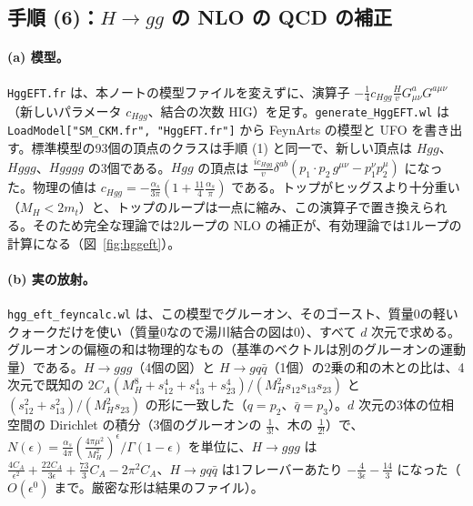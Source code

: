 \documentclass[a4paper,10pt]{ltjsarticle}
\begin{document}
\subsection{手順 (6)：$H\to gg$ の NLO の QCD の補正}\label{sec:step6}

\paragraph{(a) 模型。}\texttt{HggEFT.fr} は、本ノートの模型ファイルを変えずに、演算子 $-\frac14c_{Hgg}\frac H{v}G^a_{\mu\nu}G^{a\mu\nu}$（新しいパラメータ $c_{Hgg}$、結合の次数 HIG）を足す。\texttt{generate\_HggEFT.wl} は \texttt{LoadModel["SM\_CKM.fr", "HggEFT.fr"]} から FeynArts の模型と UFO を書き出す。標準模型の93個の頂点のクラスは手順 (1) と同一で、新しい頂点は $Hgg$、$Hggg$、$Hgggg$ の3個である。$Hgg$ の頂点は $\frac{ic_{Hgg}}v\delta^{ab}(p_1\cdot p_2\,g^{\mu\nu}-p_1^\nu p_2^\mu)$ になった。物理の値は $c_{Hgg}=-\frac{\alpha_s}{3\pi}(1+\frac{11}4\frac{\alpha_s}\pi)$ である。トップがヒッグスより十分重い（$M_H<2m_t$）と、トップのループは一点に縮み、この演算子で置き換えられる。そのため完全な理論では2ループの NLO の補正が、有効理論では1ループの計算になる（図~\ref{fig:hggeft}）。

\paragraph{(b) 実の放射。}\texttt{hgg\_eft\_feyncalc.wl} は、この模型でグルーオン、そのゴースト、質量0の軽いクォークだけを使い（質量0なので湯川結合の図は0）、すべて $d$ 次元で求める。グルーオンの偏極の和は物理的なもの（基準のベクトルは別のグルーオンの運動量）である。$H\to ggg$（4個の図）と $H\to gq\bar q$（1個）の2乗の和の木との比は、4次元で既知の $2C_A(M_H^8+s_{12}^4+s_{13}^4+s_{23}^4)/(M_H^2s_{12}s_{13}s_{23})$ と $(s_{12}^2+s_{13}^2)/(M_H^2s_{23})$ の形に一致した（$q=p_2$、$\bar q=p_3$）。$d$ 次元の3体の位相空間の Dirichlet の積分（3個のグルーオンの $\frac1{3!}$、木の $\frac1{2!}$）で、$N(\epsilon)=\frac{\alpha_s}{4\pi}(\frac{4\pi\mu^2}{M_H^2})^\epsilon/\Gamma(1-\epsilon)$ を単位に、$H\to ggg$ は $\frac{4C_A}{\epsilon^2}+\frac{22C_A}{3\epsilon}+\frac{73}3C_A-2\pi^2C_A$、$H\to gq\bar q$ は1フレーバーあたり $-\frac4{3\epsilon}-\frac{14}3$ になった（$O(\epsilon^0)$ まで。厳密な形は結果のファイル）。
\end{document}
